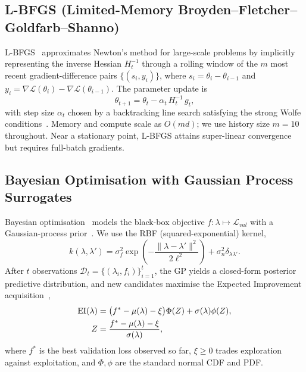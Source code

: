 \documentclass[11pt]{article}
\theoremstyle{definition}
\newcommand{\calL}{\mathcal{L}}
\newcommand{\calD}{\mathcal{D}}
\newcommand{\EI}{\mathrm{EI}}
\begin{document}
\subsection{L-BFGS (Limited-Memory Broyden--Fletcher--Goldfarb--Shanno)}

L-BFGS~\cite{liu1989lbfgs,byrd1995} approximates Newton's method for
large-scale problems by implicitly representing the inverse Hessian
$H_t^{-1}$ through a rolling window of the $m$ most recent
gradient-difference pairs $\{(s_i, y_i)\}$, where
$s_i = \theta_i - \theta_{i-1}$ and
$y_i = \nabla\mathcal{L}(\theta_i) - \nabla\mathcal{L}(\theta_{i-1})$.
The parameter update is
\begin{equation}
\theta_{t+1} = \theta_t - \alpha_t\,H_t^{-1}\,g_t,
\label{eq:lbfgs}
\end{equation}
with step size $\alpha_t$ chosen by a backtracking line search
satisfying the strong Wolfe conditions~\cite{wolfe1969}. Memory and
compute scale as $O(md)$; we use history size $m=10$ throughout.
Near a stationary point, L-BFGS attains super-linear convergence but
requires full-batch gradients.

\subsection{Bayesian Optimisation with Gaussian Process Surrogates}

Bayesian optimisation~\cite{snoek2012} models the black-box objective
$f:\lambda\mapsto\calL_{val}$ with a Gaussian-process
prior~\cite{rasmussen2006}. We use the RBF (squared-exponential)
kernel,
\begin{equation}
k(\lambda,\lambda') = \sigma_f^2\exp\!\left(-\frac{\|\lambda-\lambda'\|^2}{2\ell^2}\right)
+\sigma_n^2\delta_{\lambda\lambda'}.
\label{eq:rbf}
\end{equation}
After $t$ observations $\calD_t = \{(\lambda_i, f_i)\}_{i=1}^t$, the
GP yields a closed-form posterior predictive distribution, and new
candidates maximise the Expected Improvement
acquisition~\cite{mockus1975},
\begin{align}
\EI(\lambda) &=
  \bigl(f^*-\mu(\lambda)-\xi\bigr)\Phi(Z)
  +\sigma(\lambda)\phi(Z),
\label{eq:ei}\\
Z &= \frac{f^*-\mu(\lambda)-\xi}{\sigma(\lambda)}, \notag
\end{align}
where $f^*$ is the best validation loss observed so far,
$\xi\ge 0$ trades exploration against exploitation, and $\Phi,\phi$
are the standard normal CDF and PDF.
\end{document}
